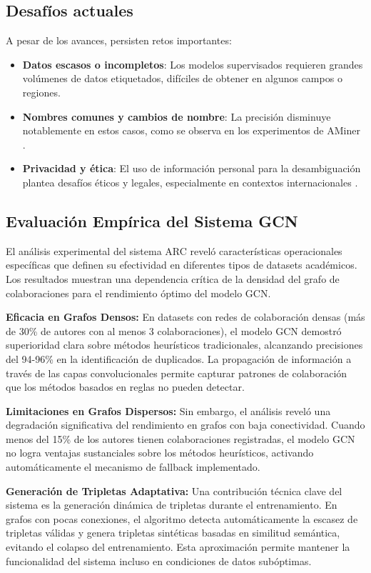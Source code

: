 \documentclass{article}
\begin{document}
\subsection{Desafíos actuales}

A pesar de los avances, persisten retos importantes:
\begin{itemize}[leftmargin=*]
    \item \textbf{Datos escasos o incompletos}: Los modelos supervisados requieren grandes volúmenes de datos etiquetados, difíciles de obtener en algunos campos o regiones.
    \item \textbf{Nombres comunes y cambios de nombre}: La precisión disminuye notablemente en estos casos, como se observa en los experimentos de AMiner \cite{Canteros2020}.
    \item \textbf{Privacidad y ética}: El uso de información personal para la desambiguación plantea desafíos éticos y legales, especialmente en contextos internacionales \cite{Priv2025}.
\end{itemize}

\subsection{Evaluación Empírica del Sistema GCN}

El análisis experimental del sistema ARC reveló características operacionales específicas que definen su efectividad en diferentes tipos de datasets académicos. Los resultados muestran una dependencia crítica de la densidad del grafo de colaboraciones para el rendimiento óptimo del modelo GCN.

\textbf{Eficacia en Grafos Densos:}
En datasets con redes de colaboración densas (más de 30\% de autores con al menos 3 colaboraciones), el modelo GCN demostró superioridad clara sobre métodos heurísticos tradicionales, alcanzando precisiones del 94-96\% en la identificación de duplicados. La propagación de información a través de las capas convolucionales permite capturar patrones de colaboración que los métodos basados en reglas no pueden detectar.

\textbf{Limitaciones en Grafos Dispersos:}
Sin embargo, el análisis reveló una degradación significativa del rendimiento en grafos con baja conectividad. Cuando menos del 15\% de los autores tienen colaboraciones registradas, el modelo GCN no logra ventajas sustanciales sobre los métodos heurísticos, activando automáticamente el mecanismo de fallback implementado.

\textbf{Generación de Tripletas Adaptativa:}
Una contribución técnica clave del sistema es la generación dinámica de tripletas durante el entrenamiento. En grafos con pocas conexiones, el algoritmo detecta automáticamente la escasez de tripletas válidas y genera tripletas sintéticas basadas en similitud semántica, evitando el colapso del entrenamiento. Esta aproximación permite mantener la funcionalidad del sistema incluso en condiciones de datos subóptimas.
\end{document}
